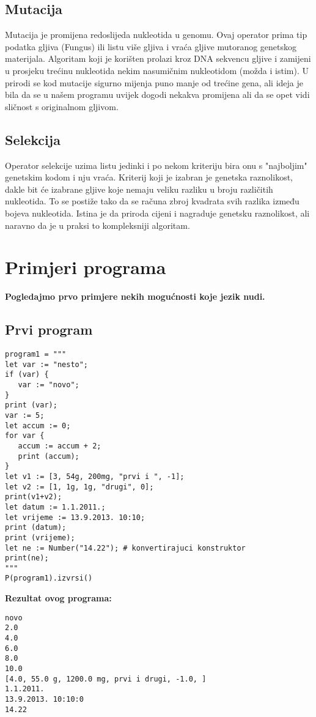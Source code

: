 \documentclass{article}
\begin{document}
\subsection{Mutacija}
Mutacija je promijena redoslijeda nukleotida u genomu. Ovaj operator prima tip podatka gljiva (Fungus) ili
listu više gljiva i vraća gljive mutoranog genetskog materijala. Algoritam koji je korišten prolazi kroz
DNA sekvencu gljive i zamijeni u prosjeku trećinu nukleotida nekim nasumičnim nukleotidom (možda i istim).
U prirodi se kod mutacije sigurno mijenja puno manje od trećine gena, ali ideja je bila da se u našem
programu uvijek dogodi nekakva promijena ali da se opet vidi sličnost s originalnom gljivom.
\subsection{Selekcija}
Operator selekcije uzima listu jedinki i po nekom kriteriju bira onu s "najboljim" genetskim kodom i nju
vraća. Kriterij koji je izabran je genetska raznolikost, dakle bit će izabrane gljive koje nemaju
veliku razliku u broju različitih nukleotida. To se postiže tako da se računa zbroj kvadrata svih razlika
između bojeva nukleotida. Istina je da priroda cijeni i nagraduje genetsku raznolikost, ali naravno da je
u praksi to kompleksniji algoritam.

\section{Primjeri programa}
\textbf{Pogledajmo prvo primjere nekih mogućnosti koje jezik nudi.}
\subsection{Prvi program}
\begin{lstlisting}
program1 = """
let var := "nesto";
if (var) {
   var := "novo";
}
print (var);
var := 5;
let accum := 0;
for var {
   accum := accum + 2;
   print (accum);
}
let v1 := [3, 54g, 200mg, "prvi i ", -1];
let v2 := [1, 1g, 1g, "drugi", 0];
print(v1+v2);
let datum := 1.1.2011.;
let vrijeme := 13.9.2013. 10:10;
print (datum);
print (vrijeme);
let ne := Number("14.22"); # konvertirajuci konstruktor
print(ne);
"""
P(program1).izvrsi()
\end{lstlisting}
\textbf{Rezultat ovog programa:}
\begin{lstlisting}
novo
2.0
4.0
6.0
8.0
10.0
[4.0, 55.0 g, 1200.0 mg, prvi i drugi, -1.0, ]
1.1.2011.
13.9.2013. 10:10:0
14.22
\end{lstlisting}
\end{document}
